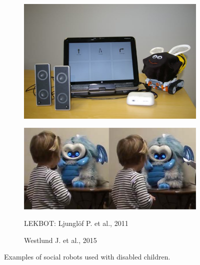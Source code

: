 \documentclass[a4paper,twoside]{book}
\begin{document}
\begin{figure}[h]
 
\begin{subfigure}[b]{\textwidth/2}
\includegraphics[width=\textwidth]{img/Ljunglof} 
\end{subfigure}
\begin{subfigure}[b]{\textwidth/2}
\includegraphics[width=\textwidth]{img/Westlund}
\end{subfigure}

\begin{subfigure}[t]{\textwidth/2}
\caption{LEKBOT: Ljungl\"of P. et al., 2011}
\end{subfigure}
\begin{subfigure}[t]{\textwidth/2}
\caption{Westlund J. et al., 2015}
\end{subfigure}

\caption{Examples of social robots used with disabled children.}
\end{figure}
\end{document}
